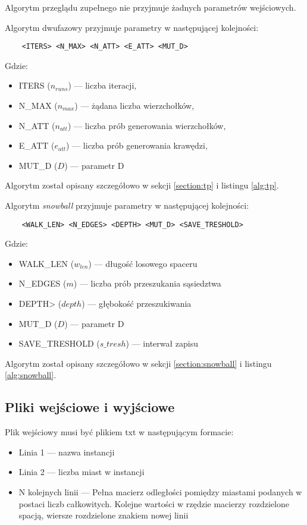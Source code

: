 Algorytm przeglądu zupełnego nie przyjmuje żadnych parametrów wejściowych.

Algorytm dwufazowy przyjmuje parametry w następującej kolejności:

\begin{lstlisting}
    <ITERS> <N_MAX> <N_ATT> <E_ATT> <MUT_D>
\end{lstlisting}
Gdzie:
\begin{itemize}
    \item ITERS ($n_{runs}$) --- liczba iteracji,
    \item N\_MAX ($n_{max}$) --- żądana liczba wierzchołków,
    \item N\_ATT ($n_{att}$) --- liczba prób generowania wierzchołków,
    \item E\_ATT ($e_{att}$) --- liczba prób generowania krawędzi,
    \item MUT\_D ($D$) --- parametr D
\end{itemize}

Algorytm został opisany szczegółowo w sekcji \ref{section:tp} i listingu \ref{alg:tp}.

Algorytm \textit{snowball} przyjmuje parametry w następującej kolejności:

\begin{lstlisting}
    <WALK_LEN> <N_EDGES> <DEPTH> <MUT_D> <SAVE_TRESHOLD>
\end{lstlisting}
Gdzie:
\begin{itemize}
    \item WALK\_LEN ($w_{len}$) --- długość losowego spaceru
    \item N\_EDGES ($m$) --- liczba prób przeszukania sąsiedztwa
    \item DEPTH> ($depth$) --- głębokość przeszukiwania
    \item MUT\_D ($D$) --- parametr D
    \item SAVE\_TRESHOLD ($s\_tresh$) --- interwał zapisu
\end{itemize}

Algorytm został opisany szczegółowo w sekcji \ref{section:snowball} i listingu \ref{alg:snowball}.

\subsection{Pliki wejściowe i wyjściowe}

Plik wejściowy musi być plikiem txt w następującym formacie:
\begin{itemize}
    \item Linia 1 --- nazwa instancji
    \item Linia 2 --- liczba miast w instancji
    \item N kolejnych linii --- Pełna macierz odległości pomiędzy miastami podanych w postaci liczb całkowitych.
          Kolejne wartości w rzędzie macierzy rozdzielone spacją, wiersze rozdzielone znakiem nowej linii
\end{itemize}


